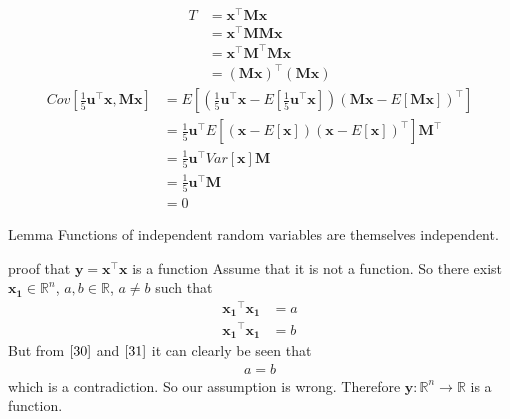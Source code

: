 \documentclass{beamer}
\renewcommand{\vec}[1]{\mathbf{#1}}
\providecommand{\brak}[1]{\ensuremath{\left(#1\right)}}
\providecommand{\mean}[1]{E[ #1 ]}
\providecommand{\sbrak}[1]{\ensuremath{{}\left[#1\right]}}
\begin{document}
\begin{frame}

\begin{align}
   T&=\vec{x}^{\top}\vec{M}\vec{x}\\
    &=\vec{x}^{\top}\vec{M}\vec{M}\vec{x}\\
    &=\vec{x}^{\top}\vec{M}^{\top}\vec{M}\vec{x}\\
    &=\brak{\vec{M}\vec{x}}^{\top}\brak{\vec{M}\vec{x}}\label{3.5} 
\end{align}
\begin{align}
    Cov\sbrak{\frac{1}{5}\vec{u}^{\top}\vec{x},\vec{M}\vec{x}}&=\mean{\brak{\frac{1}{5}\vec{u}^{\top}\vec{x}-\mean{\frac{1}{5}\vec{u}^{\top}\vec{x}}}\brak{\vec{M}\vec{x}-\mean{\vec{M}\vec{x}}}^{\top}}\\
    &=\frac{1}{5}\vec{u}^{\top}\mean{\brak{\vec{x}-\mean{\vec{x}}}\brak{\vec{x}-\mean{\vec{x}}}^{\top}}\vec{M}^{\top} \\
    &=\frac{1}{5}\vec{u}^{\top}Var\sbrak{\vec{x}}\vec{M}\\
    &=\frac{1}{5}\vec{u}^{\top}\vec{M}\\
    &=0
\end{align}
\end{frame}
\begin{frame}
\begin{block}{Lemma}
 Functions of independent random variables are themselves independent.
\end{block}
\begin{block}{proof that $\vec{y}=\vec{x}^{\top}\vec{x}$ is a function}
Assume that it is not a function. So there exist $\vec{x_1}\in\mathbb{R}^n $, $a,b\in\mathbb{R}$, $a\neq b$ such that 
\begin{align}
    \vec{x_1}^{\top}\vec{x_1}&=a\label{30}\\
    \vec{x_1}^{\top}\vec{x_1}&=b\label{31}
\end{align}
But from $\eqref{30}$ and $\eqref{31}$ it can clearly be seen that 
\begin{align}
    a=b
\end{align}
which is a contradiction. So our assumption is wrong. Therefore $\vec{y}:\mathbb{R}^n\rightarrow\mathbb{R}$ is a function.
\end{block}
\end{frame}
\end{document}
